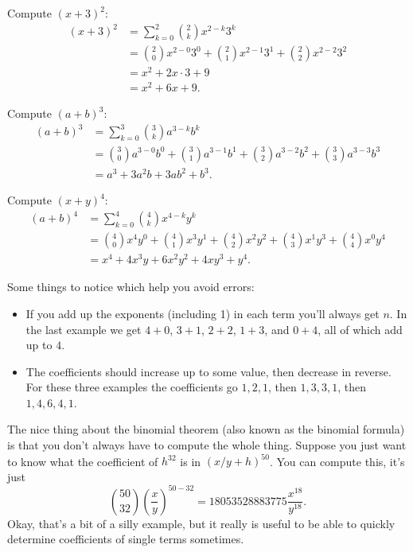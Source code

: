 \documentclass[fleqn]{LectureClass/LectureClass}
\begin{document}
    \begin{exm}{}{}
        Compute \((x + 3)^2\):
        \begin{align}
            (x + 3)^2 &= \sum_{k=0}^2 \binom{2}{k} x^{2 - k}3^k\\
            &= \binom{2}{0} x^{2 - 0} 3^0 + \binom{2}{1} x^{2 - 1} 3^1 + \binom{2}{2} x^{2 - 2} 3^2\\
            &= x^2 + 2 x \cdot 3 + 9\\
            &= x^2 + 6x + 9.
        \end{align}
        
        Compute \((a + b)^3\):
        \begin{align}
            (a + b)^3 &= \sum_{k=0}^3 \binom{3}{k} a^{3 - k} b^k\\
            &= \binom{3}{0} a^{3 - 0} b^0 + \binom{3}{1} a^{3 - 1} b^1 + \binom{3}{2} a^{3 - 2} b^2 + \binom{3}{3} a^{3 - 3} b^3\\
            &= a^3 + 3a^2b + 3ab^2 + b^3.
        \end{align}
         
        Compute \((x + y)^4\):
        \begingroup
        \allowdisplaybreaks
        \begin{align}
            (a + b)^4 &= \sum_{k=0}^4 \binom{4}{k} x^{4 - k} y^k\\
            &= \binom{4}{0} x^4 y^0 + \binom{4}{1} x^3 y^1 + \binom{4}{2} x^2 y^2 + \binom{4}{3} x^1 y^3 + \binom{4}{4} x^0 y^4\\
            &= x^4 + 4x^3y + 6x^2y^2 + 4xy^3 + y^4.
        \end{align}
        \endgroup
    \end{exm}
     
    Some things to notice which help you avoid errors:
    \begin{itemize}
        \item If you add up the exponents (including 1) in each term you'll always get \(n\).
        In the last example we get \(4 + 0\), \(3 + 1\), \(2 + 2\), \(1 + 3\), and \(0 + 4\), all of which add up to \(4\).
        \item The coefficients should increase up to some value, then decrease in reverse.
        For these three examples the coefficients go \(1, 2, 1\), then \(1, 3, 3, 1\), then \(1, 4, 6, 4, 1\).
    \end{itemize}
     
    The nice thing about the binomial theorem (also known as the binomial formula) is that you don't always have to compute the whole thing.
    Suppose you just want to know what the coefficient of \(h^{32}\) is in \((x/y + h)^{50}\).
    You can compute this, it's just
    \begin{equation}
        \binom{50}{32} \left( \frac{x}{y} \right)^{50 - 32} = 18053528883775\frac{x^{18}}{y^{18}}.
    \end{equation}
    Okay, that's a bit of a silly example, but it really is useful to be able to quickly determine coefficients of single terms sometimes.
     
\end{document}
